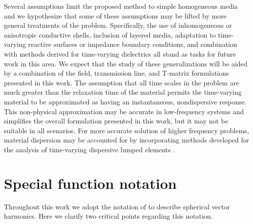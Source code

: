 \documentclass[article]{IEEEtran}
\begin{document}
Several assumptions limit the proposed method to simple homogeneous media and we hypothesize that some of these assumptions may be lifted by more general treatments of the problem.  Specifically, the use of inhomogeneous or anisotropic conductive shells, inclusion of layered media, adaptation to time-varying reactive surfaces or impedance boundary conditions, and combination with methods derived for time-varying dielectrics all stand as tasks for future work in this area.  We expect that the study of these generalizations will be aided by a combination of the field, transmission line, and T-matrix formulations presented in this work. The assumption that all time scales in the problem are much greater than the relaxation time of the material permits the time-varying material to be approximated as having an instantaneous, nondispersive response.  This non-physical approximation may be accurate in low-frequency systems and simplifies the overall formulation presented in this work, but it may not be suitable in all scenarios.  For more accurate solution of higher frequency problems, material dispersion may be accounted for by incorporating methods developed for the analysis of time-varying dispersive lumped elements \cite{jayathurathnage2021time}. 








\appendices

\section{Special function notation}
\label{sec:special-functions}
Throughout this work we adopt the notation of \cite{losenicky2020method} to describe spherical vector harmonics.  Here we clarify two critical points regarding this notation.
\end{document}
